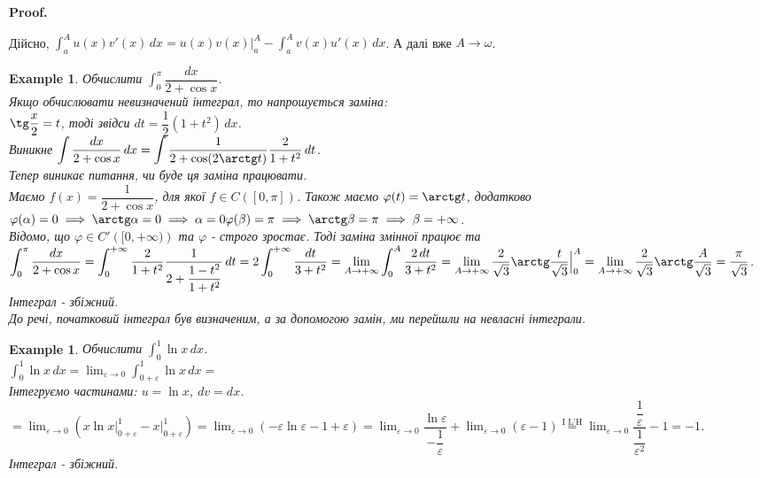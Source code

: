 \documentclass[a4paper, 10pt]{article}
\makeatletter
\def\huge{\displaystyle}
\def\qed{$\blacksquare$}
\theoremstyle{theoremdd}
\theoremstyle{theoremdd}
\theoremstyle{theoremdd}
\theoremstyle{theoremdd}
\theoremstyle{theoremdd}
\newtheorem{example}[theorem]{Example}
\theoremstyle{theoremdd}
\theoremstyle{theoremdd}
\theoremstyle{theoremdd}
\theoremstyle{theoremdd}
\renewenvironment{proof}[1][Proof.\\]{\par
\pushQED{\hfill \qed}%
\normalfont \topsep6\p@\@plus6\p@\relax
\trivlist
\item\relax
{\bfseries
#1\@addpunct{.}}\hspace\labelsep\ignorespaces
}{%
\popQED\endtrivlist\@endpefalse
}
\makeatother
\begin{document}
\begin{proof}
Дійсно, $\displaystyle\int_a^A u(x)v'(x)\,dx = u(x)v(x) \Big|_a^{A} - \int_a^A v(x)u'(x)\,dx$. А далі вже $A \to \omega$.
\end{proof}

\begin{example}
Обчислити $\huge\int_0^{\pi} \dfrac{dx}{2+\cos x}$.\\
Якщо обчислювати невизначений інтеграл, то напрошується заміна: \\
$\tg \dfrac{x}{2} = t$, тоді звідси $dt = \dfrac{1}{2} (1+t^2)\,dx$.\\
Виникне $\huge\int \dfrac{dx}{2+\cos x} \,dx = \int \dfrac{1}{2+\cos (2 \arctg t)} \dfrac{2}{1+t^2}\,dt$.\\
Тепер виникає питання, чи буде ця заміна працювати.\\
Маємо $f(x) = \dfrac{1}{2+\cos x}$, для якої $f \in C([0,\pi])$. Також маємо $\varphi(t) = \arctg t$, додатково \\
$\varphi(\alpha) = 0 \implies \arctg \alpha = 0 \implies \alpha = 0 \\
\varphi(\beta) = \pi \implies \arctg \beta = \pi \implies \beta = +\infty$.\\ 
Відомо, що $\varphi \in C'\left([0,+\infty)\right)$ та $\varphi$ - строго зростає. Тоді заміна змінної працює та\\
$\huge\int_0^\pi \dfrac{dx}{2+\cos x} = \int_0^{+\infty} \dfrac{2}{1+t^2} \dfrac{1}{2 + \dfrac{1-t^2}{1+t^2}}\,dt = 2 \int_0^{+\infty} \dfrac{dt}{3+t^2} = \lim_{A \to +\infty} \int_0^A \dfrac{2\,dt}{3+t^2} = \lim_{A \to +\infty} \dfrac{2}{\sqrt{3}} \arctg \dfrac{t}{\sqrt{3}} \Big|_0^A = \lim_{A \to +\infty} \dfrac{2}{\sqrt{3}} \arctg \dfrac{A}{\sqrt{3}} = \dfrac{\pi}{\sqrt{3}}$.\\
Інтеграл - збіжний.\\
До речі, початковий інтеграл був визначеним, а за допомогою замін, ми перейшли на невласні інтеграли.
\end{example}

\begin{example} Обчислити $\huge\int_0^1 \ln x \,dx$.\\
$\huge\int_0^1 \ln x \,dx = \huge \lim_{\varepsilon \to 0} \int_{0+\varepsilon}^1 \ln x \,dx \boxed{=}$\\
Інтегруємо частинами: $u = \ln x$, $dv = dx$.\\
$\boxed{=} \huge\lim_{\varepsilon \to 0} \left(x \ln x \Big|_{0+\varepsilon}^1 - x \Big|_{0+\varepsilon}^1 \right) = \lim_{\varepsilon \to 0} \left( -\varepsilon \ln \varepsilon - 1 + \varepsilon \right) = \lim_{\varepsilon \to 0} \dfrac{\ln \varepsilon}{-\dfrac{1}{\varepsilon}} + \lim_{\varepsilon \to 0} (\varepsilon - 1) \overset{\text{I L'H}}{=} \lim_{\varepsilon \to 0} \dfrac{\dfrac{1}{\varepsilon}}{\dfrac{1}{\varepsilon^2}} - 1 = -1$.\\
Інтеграл - збіжний.
\end{example}
\end{document}
